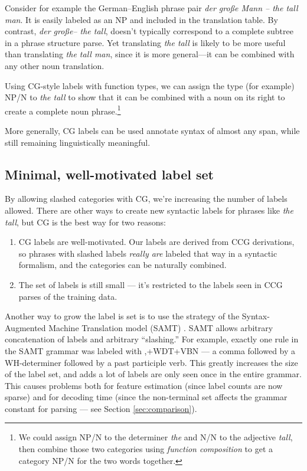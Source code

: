 \documentclass[a4paper]{article}
\begin{document}
Consider for example the German--English phrase pair {\em der gro\ss{}e Mann -- the tall man}. It is easily labeled as an NP and included in the translation table. By contrast, {\em der gro\ss{}e-- the tall}, doesn't typically correspond to a complete subtree in a phrase structure parse. Yet translating {\em the tall} is likely to be more useful than translating {\em the tall man}, since it is more general---it can be combined with any other noun translation.

Using CG-style labels with function types, we can assign the type (for example) NP/N to {\em the tall} to show that it can be combined with a noun on its right to create a complete noun phrase.\footnote{We could assign NP/N to the determiner {\em the} and N/N to the adjective {\em tall}, then combine those two categories using {\em function composition} to get a category NP/N for the two words together.}

More generally, CG labels can be used annotate syntax of almost any span, while still remaining linguistically meaningful.

\subsection{Minimal, well-motivated label set}

By allowing slashed categories with CG, we're increasing the number of labels allowed. There are other ways to create new syntactic labels for phrases like {\em the tall}, but CG is the best way for two reasons:
\begin{enumerate}
\item CG labels are well-motivated. Our labels are derived from CCG derivations, so phrases with slashed labels {\em really are} labeled that way in a syntactic formalism, and the categories can be naturally combined.
\item The set of labels is still small --- it's restricted to the labels seen in CCG parses of the training data.
\end{enumerate}

Another way to grow the label is set is to use the strategy of the Syntax-Augmented Machine Translation model (SAMT) \cite{samt-wmt06}. SAMT allows arbitrary concatenation of labels and arbitrary ``slashing.'' For example, exactly one rule in the SAMT grammar was labeled with ,+WDT+VBN --- a comma followed by a WH-determiner followed by a past participle verb. This greatly increases the size of the label set, and adds a lot of labels are only seen once in the entire grammar. This causes problems both for feature estimation (since label counts are now sparse) and for decoding time (since the non-terminal set affects the grammar constant for parsing --- see Section \ref{sec:comparison}).
\end{document}
